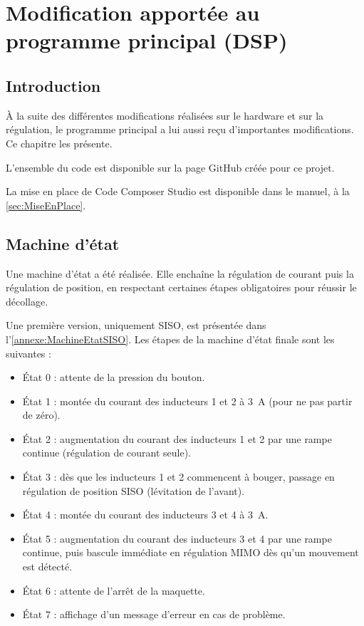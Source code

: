 \chapter{Modification apportée au programme principal (DSP)}

\section{Introduction}
À la suite des différentes modifications réalisées sur le hardware et sur la régulation, le programme principal a lui aussi reçu d'importantes modifications. Ce chapitre les présente.

L'ensemble du code est disponible sur la page GitHub créée pour ce projet.

La mise en place de Code Composer Studio est disponible dans le manuel, à la \autoref{sec:MiseEnPlace}.

\section{Machine d'état}
Une machine d'état a été réalisée. Elle enchaîne la régulation de courant puis la régulation de position, en respectant certaines étapes obligatoires pour réussir le décollage.

Une première version, uniquement SISO, est présentée dans l'\autoref{annexe:MachineEtatSISO}. Les étapes de la machine d'état finale sont les suivantes :

\begin{itemize}
    \item État 0 : attente de la pression du bouton.
    \item État 1 : montée du courant des inducteurs 1 et 2 à 3~A (pour ne pas partir de zéro).
    \item État 2 : augmentation du courant des inducteurs 1 et 2 par une rampe continue (régulation de courant seule).
    \item État 3 : dès que les inducteurs 1 et 2 commencent à bouger, passage en régulation de position SISO (lévitation de l'avant).
    \item État 4 : montée du courant des inducteurs 3 et 4 à 3~A.
    \item État 5 : augmentation du courant des inducteurs 3 et 4 par une rampe continue, puis bascule immédiate en régulation MIMO dès qu'un mouvement est détecté.
    \item État 6 : attente de l'arrêt de la maquette.
    \item État 7 : affichage d'un message d'erreur en cas de problème.
\end{itemize}

